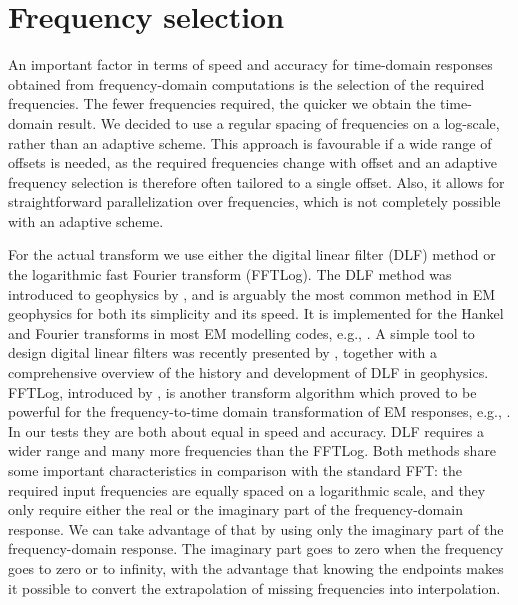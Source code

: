 \documentclass[extra, camera,%
    referee,     %
]{gji}
\begin{document}
\section{Frequency selection} %

An important factor in terms of speed and accuracy for time-domain responses
obtained from frequency-domain computations is the selection of the required
frequencies. The fewer frequencies required, the quicker we obtain the
time-domain result.  We decided to use a regular spacing of frequencies on a
log-scale, rather than an adaptive scheme. This approach is favourable if a
wide range of offsets is needed, as the required frequencies change with offset
and an adaptive frequency selection is therefore often tailored to a single
offset. Also, it allows for straightforward parallelization over frequencies,
which is not completely possible with an adaptive scheme.

For the actual transform we use either the digital linear filter (DLF) method
or the logarithmic fast Fourier transform (FFTLog). The DLF method was
introduced to geophysics by \cite{GP.71.Ghosh}, and is arguably the most common
method in EM geophysics for both its simplicity and its speed. It is
implemented for the Hankel and Fourier transforms in most EM modelling codes,
e.g., \cite{GEO.09.Key}. A simple tool to design digital linear filters was
recently presented by \cite{GEO.19.Werthmuller}, together with a comprehensive
overview of the history and development of DLF in geophysics. FFTLog,
introduced by \cite{RAS.00.Hamilton}, is another transform algorithm which
proved to be powerful for the frequency-to-time domain transformation of EM
responses, e.g., \cite{INT.14.Werthmuller}. In our tests they are both about
equal in speed and accuracy. DLF requires a wider range and many more
frequencies than the FFTLog. Both methods share some important characteristics
in comparison with the standard FFT: the required input frequencies are equally
spaced on a logarithmic scale, and they only require either
the real or the imaginary part of the frequency-domain response. We can take
advantage of that by using only the imaginary part of the frequency-domain
response. The imaginary part goes to zero when the frequency goes to zero or to
infinity, with the advantage that knowing the endpoints makes it possible to
convert the extrapolation of missing frequencies into interpolation.
\end{document}
